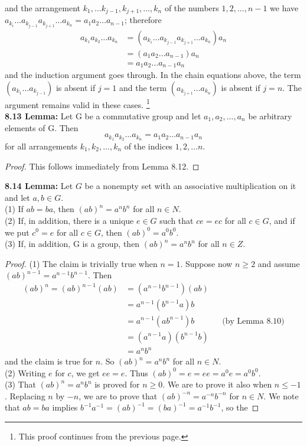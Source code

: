 \documentclass[11pt]{amsbook}
\begin{document}

and the arrangement $k_1 , \dots k_{j-1} , k_{j+1} , \dots , k_n$ of the numbers $1 , 2 , \dots , n-1$ we
have $a_{k_i} \dots a_{k_{j-1}} a_{k_{j+1}} \dots a_{k_n} = a_1 a_2 \dots a_{n-1}$; therefore
\begin{align*}
	a_{k_1} a_{k_2} \dots a_{k_n} &= (a_{k_i} \dots a_{k_{j-1}} a_{k_{j+1}} \dots a_{k_n}) a_n \\
	&= (a_1 a_2 \dots a_{n-1}) a_n \\
	&= a_1 a_2 \dots a_{n-1} a_n
\end{align*}
and the induction argument goes through. In the chain equations
above, the term $(a_{k_1} \dots a_{k_{j-1}})$ is absent if $j = 1$ and the term $(a_{k_{j+1}} \dots a_{k_n})$ is
absent if $j = n$. The argument remains valid in these cases. \footnote{This proof continues from the previous page.}
\\
\textbf{8.13 Lemma:} Let G be a commutative group and let $a_1 , a_2, \dots , a_n$ be arbitrary
elements of G. Then
\[
	a_{k_1} a_{k_2} \dots a_{k_n} = a_1 a_2 \dots a_{n-1} a_n
\]
for all arrangements $k_1,k_2, \dots ,k_n$ of the indices $1,2, \dots n$.
\begin{proof}
	This follows immediately from Lemma 8.12.
\end{proof}
\textbf{8.14 Lemma:} Let $G$ be a nonempty set with an associative multiplication
on it and let $a,b \in G$.
\\
(1) If $ab = ba$, then $(ab)^n = a^n b^n$ for all $n \in N$.
\\
(2) If, in addition, there is a unique $e \in G$ such that $ce = ec$ for all $c \in G$,
and if we put $c^0 = e$ for all $c \in G$, then $(ab)^0 = a^0 b^0$.
\\
(3) If, in addition, G is a group, then $(ab)^n = a^n b^n$ for all $n \in Z$.
\begin{proof}
	(1) The claim is trivially true when $n = 1$. Suppose now $n \geq 2$ and
	assume $(ab)^{n-1} = a^{n-1} b^{n-1}$. Then
	\begin{align*}
		(ab)^n = (ab)^{n-1} (ab) &= (a^{n-1} b^{n-1}) (ab) \\
		&= a^{n-1}(b^{n-1} a) b \\
		&= a^{n-1} (a b^{n-1})b && \text{(by Lemma 8.10)} \\
		&= (a^{n-1}a)(b^{n-1}b) \\
		&= a^n b^n
	\end{align*}
	and the claim is true for $n$. So $(ab)^n = a^n b^n$ for all $n \in N$.
	\\
	(2) Writing $e$ for $c$, we get $ee = e$. Thus $(ab)^0 = e = ee = a^0 e = a^0 b^0$.
	\\
	(3) That $(ab)^n = a^n b^n$ is proved for $n \geq 0$. We are to prove it also when $n \leq -1$. Replacing $n$ by $-n$, we are to prove that $(ab)^{-n} = a^{-n} b^{-n}$ for $n \in N$. We note that $ab = ba$ implies $b^{-1} a^{-1} = (ab)^{-1} = (ba)^{-1} = a^{-1} b^{-1}$, so the
\end{proof}

\end{document}
